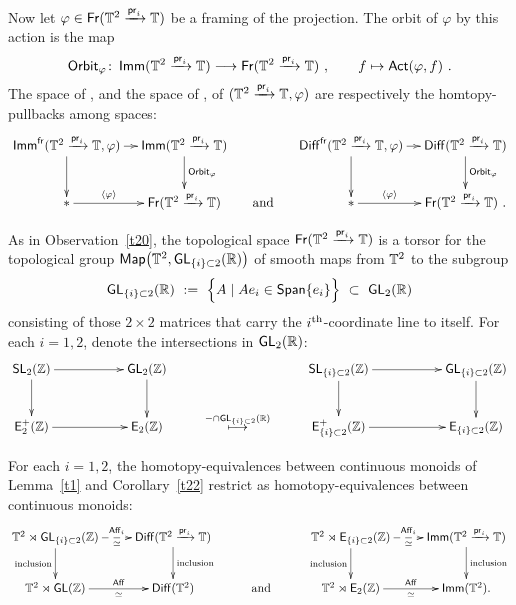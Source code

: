 Now let $\varphi \in \operatorname{\sf Fr}(\mathbb T^2 \xrightarrow{\operatorname{\mathsf{pr}}_i} \mathbb T)$ be a framing of the projection.
The orbit of $\varphi$ by this action is the map
\[
{\sf Orbit}_\varphi
\colon 
\operatorname{\sf Imm}(\mathbb T^2 \xrightarrow{\operatorname{\mathsf{pr}}_i}\mathbb T)
\longrightarrow
\operatorname{\sf Fr}(\mathbb T^2 \xrightarrow{\operatorname{\mathsf{pr}}_i} \mathbb T)
~,\qquad
f\mapsto \operatorname{\sf Act}(\varphi,f)
~.
\]
The space of , and the space of , of $(\mathbb T^2 \xrightarrow{\operatorname{\mathsf{pr}}_i} \mathbb T , \varphi)$ are respectively the homtopy-pullbacks among spaces:
\[
\xymatrix@C=1em{
\Imm^{\sf fr}(\TT^2\xra{\pr_i} \TT,\varphi)
\ar[r]
\ar[d]
&
\Imm(\TT^2\xra{\pr_i} \TT)
\ar[d]^-{{\sf Orbit}_\varphi}
&&
\Diff^{\sf fr}(\TT^2 \xra{\pr_i} \TT,\varphi)
\ar[r]
\ar[d]
&
\Diff(\TT^2\xra{\pr_i} \TT)
\ar[d]^-{{\sf Orbit}_\varphi}
\\
\ast
\ar[r]^-{\lag \varphi \rag}
&
\Fr(\TT^2\xra{\pr_i} \TT)
&
\text{ and }
&
\ast
\ar[r]^-{\lag \varphi \rag}
&
\Fr(\TT^2\xra{\pr_i} \TT)
~.
}
\]


As in Observation~\ref{t20},
the topological space $\operatorname{\sf Fr}(\mathbb T^2 \xrightarrow{\operatorname{\mathsf{pr}}_i} \mathbb T)$ is a torsor for the topological group $\operatorname{{\sf Map}}\bigl( \mathbb T^2 , \operatorname{\sf GL}_{\{i\}\subset 2}(\mathbb R) \bigr)$ of smooth maps from $\mathbb T^2$ to the subgroup 
\[
\operatorname{\sf GL}_{\{i\}\subset 2}(\mathbb R)
~:=~
\Bigl\{
A \mid
Ae_i \in {\sf Span}\{e_i\}
\Bigr\}
~\subset~
\operatorname{\sf GL}_2(\mathbb R)
\]
consisting of those $2 \times 2$ matrices that carry the $i^{\rm th}$-coordinate line to itself. 
For each $i=1,2$, denote the intersections in $\operatorname{\sf GL}_2(\mathbb R)$:
\[
\xymatrix{
\SL_2(\ZZ)
\ar[rr]
\ar[d]
&&
\GL_2(\ZZ)
\ar[d]
&
&
\SL_{\{i\}\subset 2}(\ZZ)
\ar[rr]
\ar[d]
&&
\GL_{\{i\}\subset 2}(\ZZ)
\ar[d]
\\
\EpZ
\ar[rr]
&&
\EZ
&
\overset{- \cap \GL_{\{i\}\subset 2}(\RR)}\longmapsto
&
\sE^+_{\{i\}\subset 2}(\ZZ)
\ar[rr]
&&
\sE_{\{i\}\subset 2}(\ZZ)
}
\]


\begin{lemma}
\label{t62} 
For each $i=1,2$, the homotopy-equivalences between continuous monoids of Lemma~\ref{t1} and Corollary~\ref{t22} restrict as homotopy-equivalences between continuous monoids:
\[
\xymatrix{
\TT^2 \rtimes \GL_{\{i\}\subset 2}(\ZZ)
\ar[d]_-{\rm inclusion}
\ar@{-->}[r]^-{\Aff_i}_-{\simeq}
&
\Diff(\TT^2 \xra{\pr_i} \TT)
\ar[d]^-{\rm inclusion}
&&
\TT^2 \rtimes \sE_{\{i\}\subset 2}(\ZZ) 
\ar[d]_-{\rm inclusion}
\ar@{-->}[r]^-{\Aff_i}_-{\simeq}
&
\Imm(\TT^2 \xra{\pr_i} \TT)
\ar[d]^-{\rm inclusion}
\\
\TT^2 \rtimes \GL(\ZZ)
\ar[r]^-{\Aff}_-{\simeq}
&
\Diff(\TT^2)
&
\text{ and }
&
\TT^2 \rtimes \EZ 
\ar[r]^-{\Aff}_-{\simeq}
&
\Imm(\TT^2)
.
}
\]

\end{lemma}


